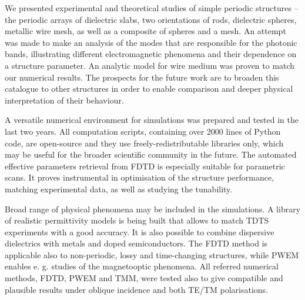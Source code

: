 

We presented experimental and theoretical studies of simple periodic structures -- the periodic arrays of dielectric slabs, two orientations of rods, dielectric spheres, metallic wire mesh, as well as a composite of spheres and a mesh. An attempt was made to make an analysis of the modes that are responsible for the photonic bands, illustrating different electromagnetic phenomena and their dependence on a structure parameter. An analytic model for wire medium was proven to match our numerical results.
The prospects for the future work are to broaden this catalogue to other structures in order to enable comparison and deeper physical interpretation of their behaviour. 


A versatile numerical environment for simulations was prepared and tested in the last two years. All computation scripts, containing over 2000 lines of Python code, are open-source and they use freely-redistributable libraries only, which may be useful for the broader scientific community in the future. 
The automated effective parameters retrieval from FDTD is especially suitable for parametric scans. It proves instrumental in optimisation of the structure performance, matching experimental data, as well as studying the tunability.

Broad range of physical phenomena may be included in the simulations. A library of realistic permittivity models is being built that allows to match TDTS experiments with a good accuracy. It is also possible to combine dispersive dielectrics with metals and doped semiconductors. 
 The FDTD method is applicable also to non-periodic, lossy and time-changing structures, while PWEM enables e. g. studies of the magnetooptic phenomena.
All referred numerical methods, FDTD, PWEM and TMM, were tested also to give compatible and plausible results under oblique incidence and both TE/TM polarisations. 

